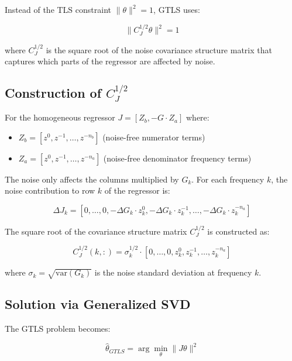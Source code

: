 Instead of the TLS constraint $\|\theta\|^2 = 1$, GTLS uses:

\begin{equation}
    \|C_J^{1/2} \theta\|^2 = 1
\end{equation}

where $C_J^{1/2}$ is the square root of the noise covariance structure matrix that captures which parts of the regressor are affected by noise.

\subsection{Construction of $C_J^{1/2}$}

For the homogeneous regressor $J = [Z_b, -G \cdot Z_a]$ where:
\begin{itemize}
    \item $Z_b = [z^0, z^{-1}, \ldots, z^{-n_b}]$ (noise-free numerator terms)
    \item $Z_a = [z^0, z^{-1}, \ldots, z^{-n_a}]$ (noise-free denominator frequency terms)
\end{itemize}

The noise only affects the columns multiplied by $G_k$. For each frequency $k$, the noise contribution to row $k$ of the regressor is:

\begin{equation}
    \Delta J_k = [0, \ldots, 0, -\Delta G_k \cdot z_k^0, -\Delta G_k \cdot z_k^{-1}, \ldots, -\Delta G_k \cdot z_k^{-n_a}]
\end{equation}

The square root of the covariance structure matrix $C_J^{1/2}$ is constructed as:

\begin{equation}
    C_J^{1/2}(k,:) = \sigma_k^{1/2} \cdot [0, \ldots, 0, z_k^0, z_k^{-1}, \ldots, z_k^{-n_a}]
\end{equation}

where $\sigma_k = \sqrt{\text{var}(G_k)}$ is the noise standard deviation at frequency $k$.

\subsection{Solution via Generalized SVD}

The GTLS problem becomes:

\begin{equation}
    \hat{\theta}_{GTLS} = \arg\min_\theta \|J \theta\|^2
\end{equation}

